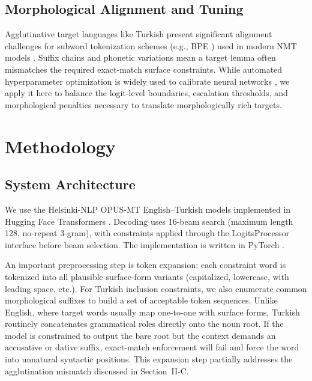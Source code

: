 \documentclass[conference]{IEEEtran}
\begin{document}
\subsection{Morphological Alignment and Tuning}

Agglutinative target languages like Turkish present significant alignment challenges for subword tokenization schemes (e.g., BPE \cite{sennrich2016bpe}) used in modern NMT models \cite{tiedemann2020opus}. Suffix chains and phonetic variations mean a target lemma often mismatches the required exact-match surface constraints. While automated hyperparameter optimization is widely used to calibrate neural networks \cite{akiba2019optuna}, we apply it here to balance the logit-level boundaries, escalation thresholds, and morphological penalties necessary to translate morphologically rich targets.


\section{Methodology}

\subsection{System Architecture}

We use the Helsinki-NLP OPUS-MT English--Turkish models \cite{tiedemann2020opus, tiedemann2023democratizing} implemented in Hugging Face Transformers \cite{wolf2020transformers}. Decoding uses 16-beam search \cite{freitag2017beam} (maximum length 128, no-repeat 3-gram), with constraints applied through the LogitsProcessor interface before beam selection. The implementation is written in PyTorch \cite{paszke2019pytorch}.

An important preprocessing step is token expansion: each constraint word is tokenized into all plausible surface-form variants (capitalized, lowercase, with leading space, etc.). For Turkish inclusion constraints, we also enumerate common morphological suffixes to build a set of acceptable token sequences. Unlike English, where target words usually map one-to-one with surface forms, Turkish routinely concatenates grammatical roles directly onto the noun root. If the model is constrained to output the bare root but the context demands an accusative or dative suffix, exact-match enforcement will fail and force the word into unnatural syntactic positions. This expansion step partially addresses the agglutination mismatch discussed in Section~II-C.
\end{document}

